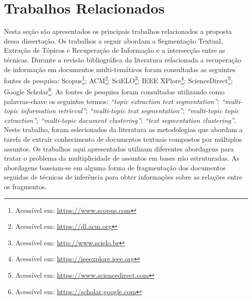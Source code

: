 \section{Trabalhos Relacionados}
\label{sec-trabalhos-relacionados}




Nesta seção são apresentados os principais trabalhos relacionados a proposta dessa dissertação. Os trabalhos a seguir abordam a Segmentação Textual, Extração de Tópicos e Recuperação de Informação e a intersecção entre as técnicas.
%
%
%
Durante a revisão bibliográfica da literatura relacionada a recuperação de informação em documentos multi-temáticos foram consultadas as seguintes fontes de pesquisa:
%
Scopus\footnote{Acessível em: \url{https://www.scopus.com}}; 
ACM\footnote{Acessível em: \url{https://dl.acm.org}}; 
SciELO\footnote{Acessível em: \url{http://www.scielo.br}};
IEEE XPlore\footnote{Acessível em: \url{https://ieeexplore.ieee.org}};
ScienceDirect\footnote{Acessível em: \url{https://www.sciencedirect.com}}; 
Google Scholar\footnote{Acessível em: \url{https://scholar.google.com}}.
%
% 
As fontes de pesquisa foram consultadas utilizando como palavras-chave os seguintes termos:
\textit{``topic extraction text segmentation''}; 
\textit{``multi-topic information retrieval''}; 
\textit{``multi-topic text segmentation''}; 
\textit{``multi-topic topic extraction''}; 
\textit{``multi-topic document clustering''}; 
\textit{``text segmentation clustering''}.
%
Neste trabalho, foram selecionados da literatura as metodologias que abordam a tarefa de extrair conhecimento de documentos textuais compostos por múltiplos assuntos.
%
Os trabalhos aqui apresentados utilizam diferentes abordagens para tratar o problema da multiplicidade de assuntos em bases não estruturadas. As abordagens baseiam-se em alguma forma de fragmentação dos documentos seguidas de técnicas de inferência para obter informações sobre as relações entre os fragmentos. 


